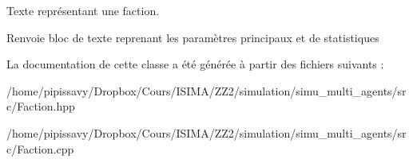 Texte représentant une faction. 

\begin{DoxyReturn}{Renvoie}
bloc de texte reprenant les paramètres principaux et de statistiques 
\end{DoxyReturn}


La documentation de cette classe a été générée à partir des fichiers suivants \-:\begin{DoxyCompactItemize}
\item 
/home/pipissavy/\-Dropbox/\-Cours/\-I\-S\-I\-M\-A/\-Z\-Z2/simulation/simu\-\_\-multi\-\_\-agents/src/Faction.\-hpp\item 
/home/pipissavy/\-Dropbox/\-Cours/\-I\-S\-I\-M\-A/\-Z\-Z2/simulation/simu\-\_\-multi\-\_\-agents/src/Faction.\-cpp\end{DoxyCompactItemize}
